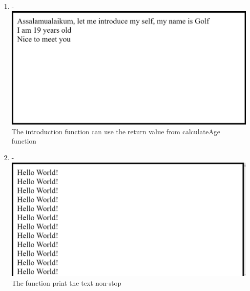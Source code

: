 \documentclass[12pt,titlepage]{article}
\begin{document}
\begin{enumerate}
    \item - \\ \includegraphics[width=.9\textwidth]{images/figures/fig8.png} \\ The introduction function can use the return value from calculateAge function
    \item - \\ \includegraphics[width=.9\textwidth]{images/figures/fig9.png} \\ The function print the text non-stop
    
    \newpage


\end{enumerate}
\end{document}
